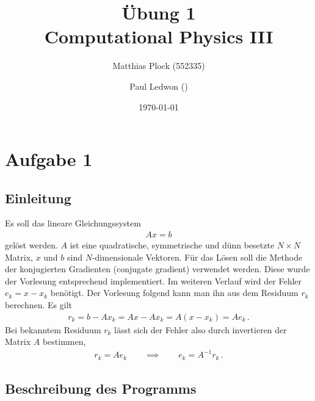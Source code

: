 \documentclass[10pt,a4paper]{article}
\title{Übung 1 \\Computational Physics III}
\author{Matthias Plock (552335) \and Paul Ledwon ()} %
\date{\today}
\begin{document}
\maketitle
\tableofcontents

\pagestyle{myheadings}                  %

\section{Aufgabe 1}

\subsection{Einleitung}

Es soll das lineare Gleichungssystem
\begin{align*}
  Ax = b
\end{align*}
gelöst werden. $A$ ist eine quadratische, symmetrische und dünn besetzte
$N\times N$ Matrix, $x$ und $b$ sind $N$-dimensionale Vektoren. Für das Lösen
soll die Methode der konjugierten Gradienten (conjugate gradient) verwendet
werden. Diese wurde der Vorlesung entsprechend implementiert.
Im weiteren Verlauf wird der Fehler $e_{k} = x - x_{k}$ benötigt. Der Vorlesung
folgend kann man ihn aus dem Residuum $r_{k}$ berechnen. Es gilt
\begin{align*}
  r_{k} = b - Ax_{k} = Ax - Ax_{k} = A(x - x_{k}) = Ae_{k}\,.
\end{align*}
Bei bekanntem Residuum $r_{k}$ lässt sich der Fehler also durch invertieren der
Matrix $A$ bestimmen,
\begin{align*}
  r_{k} = Ae_{k} \qquad \implies \qquad e_{k} = A^{-1}r_{k}\,.
\end{align*}

\subsection{Beschreibung des Programms}
\end{document}
